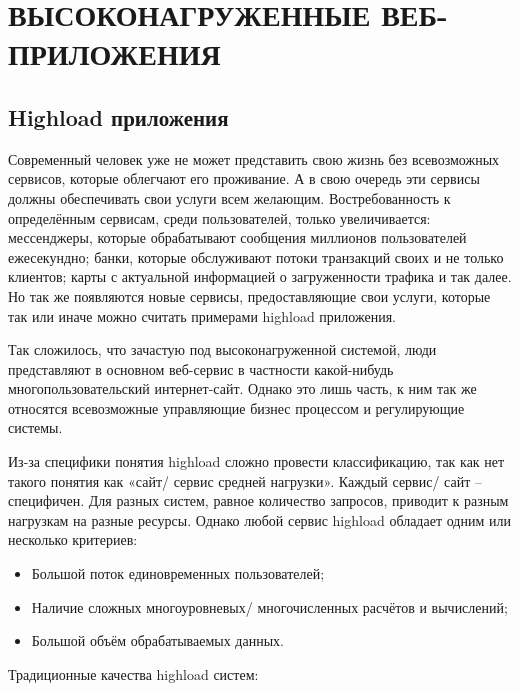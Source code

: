 \chapter{ВЫСОКОНАГРУЖЕННЫЕ ВЕБ-ПРИЛОЖЕНИЯ} \label{ch1}


\section{Highload приложения} \label{ch1:relatedSystems} 

Современный человек уже не может представить свою жизнь без всевозможных сервисов, которые облегчают его проживание. А в свою очередь эти сервисы должны обеспечивать свои услуги всем желающим. Востребованность к определённым сервисам, среди пользователей, только увеличивается: мессенджеры, которые обрабатывают сообщения миллионов пользователей ежесекундно; банки, которые обслуживают потоки транзакций своих и не только клиентов; карты с актуальной информацией о загруженности трафика и так далее. Но так же появляются новые сервисы, предоставляющие свои услуги, которые так или иначе можно считать примерами highload приложения.

Так сложилось, что зачастую под высоконагруженной системой, люди представляют в основном веб-сервис в частности какой-нибудь многопользовательский интернет-сайт. Однако это лишь часть, к ним так же относятся всевозможные управляющие бизнес процессом и регулирующие системы.

Из-за специфики понятия highload сложно провести классификацию, так как нет такого понятия как «сайт/ сервис средней нагрузки». Каждый сервис/ сайт – специфичен. Для разных систем, равное количество запросов, приводит к разным нагрузкам на разные ресурсы. Однако любой сервис highload обладает одним или несколько критериев: \cite{souders2008high}

\begin{itemize}
	\item Большой поток единовременных пользователей;
	\item Наличие сложных многоуровневых/ многочисленных расчётов и вычислений;
	\item Большой объём обрабатываемых данных.
\end{itemize}

Традиционные качества highload систем: \cite{ge2009powerpack}

